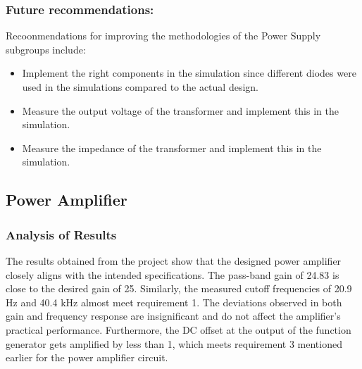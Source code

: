 \subsubsection{Future recommendations:}
Recoonmendations for improving the methodologies of the Power Supply subgroups include:
\begin{itemize}
    \item Implement the right components in the simulation since different diodes were used in the simulations compared to the actual design.
    \item Measure the output voltage of the transformer and implement this in the simulation.
    \item Measure the impedance of the transformer and implement this in the simulation.
\end{itemize}


\subsection{Power Amplifier}

\subsubsection{Analysis of Results}

The results obtained from the project show that the designed power amplifier closely aligns with the intended specifications. The pass-band gain of 24.83 is close to the desired gain of 25. Similarly, the measured cutoff frequencies of 20.9 Hz and 40.4 kHz almost meet requirement 1. The deviations observed in both gain and frequency response are insignificant and do not affect the amplifier's practical performance. Furthermore, the DC offset at the output of the function generator gets amplified by less than 1, which meets requirement 3 mentioned earlier for the power amplifier circuit.

